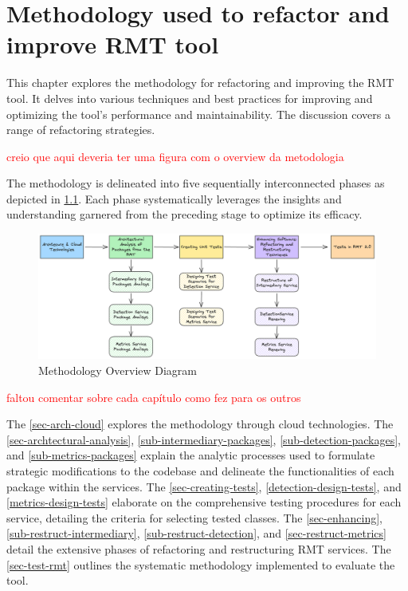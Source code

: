 \chapter{Methodology used to refactor and improve RMT tool}%
\label{methodology}

This chapter explores the methodology for refactoring and improving the RMT tool. It delves into various techniques and best practices for improving and optimizing the tool's performance and maintainability. The discussion covers a range of refactoring strategies.

\textcolor{red}{creio que aqui deveria ter uma figura com o overview da metodologia}

The methodology is delineated into five sequentially interconnected phases as depicted in \cref{fig-overview-methodology}. Each phase systematically leverages the insights and understanding garnered from the preceding stage to optimize its efficacy.

\begin{figure}[ht!]
\SetCaptionWidth{\textwidth}
\caption{Methodology Overview Diagram}
\label{fig-overview-methodology}
\includegraphics[width =\textwidth]{Chapter-4/Figures/Metodologia.png}
\end{figure}
\FloatBarrier

\textcolor{red}{faltou comentar sobre cada capítulo como fez para os outros}

The \cref{sec-arch-cloud} explores the methodology through cloud technologies. The \cref{sec-archtectural-analysis}, \ref{sub-intermediary-packages}, \ref{sub-detection-packages}, and \ref{sub-metrics-packages} explain the analytic processes used to formulate strategic modifications to the codebase and delineate the functionalities of each package within the services. The \cref{sec-creating-tests}, \ref{detection-design-tests}, and \ref{metrics-design-tests} elaborate on the comprehensive testing procedures for each service, detailing the criteria for selecting tested classes. The \cref{sec-enhancing}, \ref{sub-restruct-intermediary}, \ref{sub-restruct-detection}, and \ref{sec-restruct-metrics} detail the extensive phases of refactoring and restructuring RMT services. The \cref{sec-test-rmt} outlines the systematic methodology implemented to evaluate the tool.

